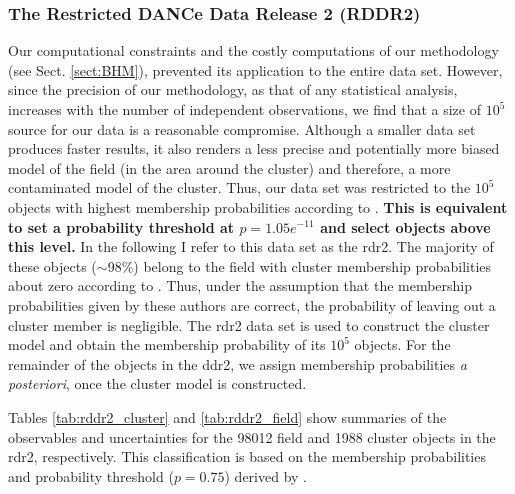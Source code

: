 \subsubsection{The Restricted DANCe Data Release 2 (RDDR2)}
Our computational constraints and the costly computations of our methodology (see Sect. \ref{sect:BHM}), prevented its application to the entire data set. However, since the precision of our methodology, as that of any statistical analysis, increases with the number of independent observations, we find that a size of $10^5$ source for our data is a reasonable compromise. Although a smaller data set produces faster results, it also renders a less precise and potentially more biased model of the field (in the area around the cluster) and therefore, a more contaminated model of the cluster. Thus, our data set was restricted to the $10^5$ objects with highest membership probabilities according to \citet{Bouy2015}. \textbf{This is equivalent to set a probability threshold at $p=1.05e^{-11}$ and select objects above this level.} In the following I refer to this data set as the \gls{rdr2}. The majority of these objects ($\sim$98\%) belong to the field with cluster membership probabilities about zero according to \citet{Sarro2014,Bouy2015}. Thus, under the assumption that the membership probabilities given by these authors are correct, the probability of leaving out a cluster member is negligible. The \gls{rdr2} data set is used to construct the cluster model and obtain the membership probability of its $10^5$ objects. For the remainder of the objects in the \gls{ddr2}, we assign membership probabilities \emph{a posteriori}, once the cluster model is constructed. 

Tables \ref{tab:rddr2_cluster} and \ref{tab:rddr2_field} show summaries of the observables and uncertainties for the 98012 field and 1988 cluster objects in the \gls{rdr2}, respectively. This classification is based on the membership probabilities and probability threshold ($p=0.75$) derived by \citet{Bouy2015}.

